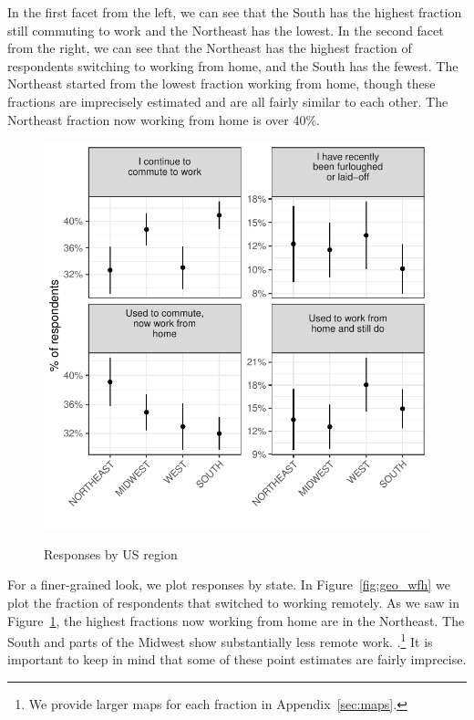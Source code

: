 \documentclass[12pt]{article}
\begin{document}
In the first facet from the left, we can see that the South has the highest fraction still commuting to work and the Northeast has the lowest. 
In the second facet from the right, we can see that the Northeast has the highest fraction of respondents switching to working from home, and the South has the fewest.
The Northeast started from the lowest fraction working from home, though these fractions are imprecisely estimated and are all fairly similar to each other. 
The Northeast fraction now working from home is over 40\%. 

\begin{figure}
  \caption{Responses by US region} \label{fig:region}
\centering
\begin{minipage}{1.0 \linewidth}
  \includegraphics[width = \linewidth]{plots/region.pdf} \\
  \begin{footnotesize}
    \end{footnotesize}
\end{minipage}
\end{figure} 

For a finer-grained look, we plot responses by state.
In Figure~\ref{fig:geo_wfh} we plot the fraction of respondents that switched to working remotely. 
As we saw in Figure~\ref{fig:region}, the highest fractions now working from home are in the Northeast.
The South and parts of the Midwest show substantially less remote work. 
.\footnote{
  We provide larger maps for each fraction in Appendix~\ref{sec:maps}. 
}
It is important to keep in mind that some of these point estimates are fairly imprecise.
\end{document}
